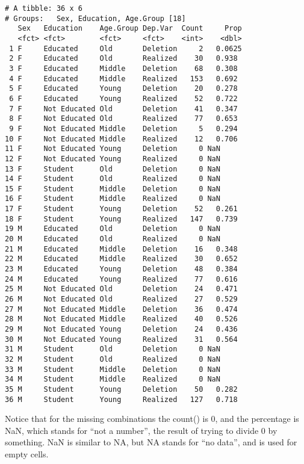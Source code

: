 \documentclass[
  12pt,
  letterpaper]{article}
\renewcommand\texttt[1]{{\ttfamily\color{BrickRed}#1}}
\begin{document}
\begin{verbatim}
# A tibble: 36 x 6
# Groups:   Sex, Education, Age.Group [18]
   Sex   Education    Age.Group Dep.Var  Count     Prop
   <fct> <fct>        <fct>     <fct>    <int>    <dbl>
 1 F     Educated     Old       Deletion     2   0.0625
 2 F     Educated     Old       Realized    30   0.938 
 3 F     Educated     Middle    Deletion    68   0.308 
 4 F     Educated     Middle    Realized   153   0.692 
 5 F     Educated     Young     Deletion    20   0.278 
 6 F     Educated     Young     Realized    52   0.722 
 7 F     Not Educated Old       Deletion    41   0.347 
 8 F     Not Educated Old       Realized    77   0.653 
 9 F     Not Educated Middle    Deletion     5   0.294 
10 F     Not Educated Middle    Realized    12   0.706 
11 F     Not Educated Young     Deletion     0 NaN     
12 F     Not Educated Young     Realized     0 NaN     
13 F     Student      Old       Deletion     0 NaN     
14 F     Student      Old       Realized     0 NaN     
15 F     Student      Middle    Deletion     0 NaN     
16 F     Student      Middle    Realized     0 NaN     
17 F     Student      Young     Deletion    52   0.261 
18 F     Student      Young     Realized   147   0.739 
19 M     Educated     Old       Deletion     0 NaN     
20 M     Educated     Old       Realized     0 NaN     
21 M     Educated     Middle    Deletion    16   0.348 
22 M     Educated     Middle    Realized    30   0.652 
23 M     Educated     Young     Deletion    48   0.384 
24 M     Educated     Young     Realized    77   0.616 
25 M     Not Educated Old       Deletion    24   0.471 
26 M     Not Educated Old       Realized    27   0.529 
27 M     Not Educated Middle    Deletion    36   0.474 
28 M     Not Educated Middle    Realized    40   0.526 
29 M     Not Educated Young     Deletion    24   0.436 
30 M     Not Educated Young     Realized    31   0.564 
31 M     Student      Old       Deletion     0 NaN     
32 M     Student      Old       Realized     0 NaN     
33 M     Student      Middle    Deletion     0 NaN     
34 M     Student      Middle    Realized     0 NaN     
35 M     Student      Young     Deletion    50   0.282 
36 M     Student      Young     Realized   127   0.718 
\end{verbatim}

Notice that for the missing combinations the \texttt{count()} is 0, and
the percentage is \texttt{NaN}, which stands for ``not a number'', the
result of trying to divide 0 by something. \texttt{NaN} is similar to
\texttt{NA}, but \texttt{NA} stands for ``no data'', and is used for
empty cells.
\end{document}
